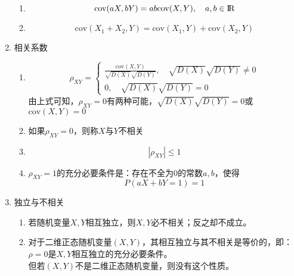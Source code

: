 \begin{enumerate}
\begin{enumerate}
		\item 
		\begin{equation}
			\mathrm{cov}(aX, bY) = ab\mathrm{cov}(X,Y), \quad a,b\in {\rm I\!R}
		\end{equation}

		\item 
		\begin{equation}
			\mathrm{cov}(X_1+X_2, Y) = \mathrm{cov}(X_1, Y) + \mathrm{cov}(X_2, Y)
		\end{equation}
	\end{enumerate}
	
	
	\item 相关系数
	\begin{enumerate}
		\item 
		\[ \rho_{XY}=\begin{cases}
			\frac{\mathrm{cov}(X,Y)}{\sqrt{D(X)}\sqrt{D(Y)}}, \quad \sqrt{D(X)}\sqrt{D(Y)} \neq 0 \\
			0, \quad \sqrt{D(X)}\sqrt{D(Y)} = 0
		\end{cases} \]
		由上式可知，$\rho_{XY} = 0$有两种可能，$\sqrt{D(X)}\sqrt{D(Y)} = 0$或$\mathrm{cov}(X,Y)=0$

		\item 如果$\rho_{XY}=0$，则称$X$与$Y$不相关

		\item 
		\begin{equation}
			\left|\rho_{XY}\right| \leq 1
		\end{equation}
		\item $\rho_{XY} = 1$的充分必要条件是：存在不全为$0$的常数$a,b$，使得
		\begin{equation}
			P(aX+bY=1) = 1
		\end{equation}
	\end{enumerate}

	\item 独立与不相关
	\begin{enumerate}
		\item 若随机变量$X,Y$相互独立，则$X,Y$必不相关；反之却不成立。
		\item 对于二维正态随机变量$(X,Y)$，其相互独立与其不相关是等价的，即：$\rho=0$是$X,Y$相互独立的充分必要条件。\\
		但若$(X,Y)$不是二维正态随机变量，则没有这个性质。
	\end{enumerate}
	

\end{enumerate}

















